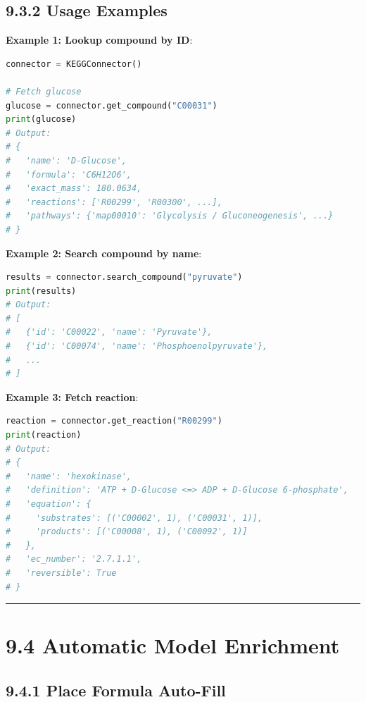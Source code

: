 \hypertarget{usage-examples}{%
\subsection{9.3.2 Usage Examples}\label{usage-examples}}

\textbf{Example 1: Lookup compound by ID}:

\begin{lstlisting}[language=Python]
connector = KEGGConnector()

# Fetch glucose
glucose = connector.get_compound("C00031")
print(glucose)
# Output:
# {
#   'name': 'D-Glucose',
#   'formula': 'C6H12O6',
#   'exact_mass': 180.0634,
#   'reactions': ['R00299', 'R00300', ...],
#   'pathways': {'map00010': 'Glycolysis / Gluconeogenesis', ...}
# }
\end{lstlisting}

\textbf{Example 2: Search compound by name}:

\begin{lstlisting}[language=Python]
results = connector.search_compound("pyruvate")
print(results)
# Output:
# [
#   {'id': 'C00022', 'name': 'Pyruvate'},
#   {'id': 'C00074', 'name': 'Phosphoenolpyruvate'},
#   ...
# ]
\end{lstlisting}

\textbf{Example 3: Fetch reaction}:

\begin{lstlisting}[language=Python]
reaction = connector.get_reaction("R00299")
print(reaction)
# Output:
# {
#   'name': 'hexokinase',
#   'definition': 'ATP + D-Glucose <=> ADP + D-Glucose 6-phosphate',
#   'equation': {
#     'substrates': [('C00002', 1), ('C00031', 1)],
#     'products': [('C00008', 1), ('C00092', 1)]
#   },
#   'ec_number': '2.7.1.1',
#   'reversible': True
# }
\end{lstlisting}

\begin{center}\rule{0.5\linewidth}{0.5pt}\end{center}

\hypertarget{automatic-model-enrichment}{%
\section{9.4 Automatic Model
Enrichment}\label{automatic-model-enrichment}}

\hypertarget{place-formula-auto-fill}{%
\subsection{9.4.1 Place Formula
Auto-Fill}\label{place-formula-auto-fill}}

